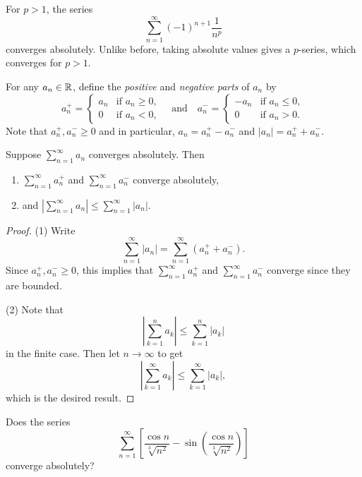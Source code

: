 \begin{example}
  For $p > 1$, the series
  \[
    \sum_{n = 1}^\infty (-1)^{n + 1} \frac{1}{n^p}
  \]
  converges absolutely. Unlike before, taking absolute
  values gives a $p$-series, which converges for $p > 1$.
\end{example}

\begin{definition}
  For any $a_n \in \mathbb{R}$, define the \emph{positive} and
  \emph{negative parts} of $a_n$ by
  \[
    a_n^+ =
    \begin{cases}
      a_n & \text{if } a_n \ge 0, \\
      0 & \text{if } a_n < 0,
    \end{cases}
    \quad \text{and} \quad
    a_n^- =
    \begin{cases}
      -a_n & \text{if } a_n \le 0, \\
      0 & \text{if } a_n > 0.
    \end{cases}
  \]
  Note that $a_n^+, a_n^- \ge 0$ and
  in particular, $a_n = a_n^+ - a_n^-$ and
  $|a_n| = a_n^+ + a_n^-$.
\end{definition}

\begin{theorem}
  Suppose $\sum_{n = 1}^\infty a_n$ converges absolutely.
  Then
  \begin{enumerate}
    \item $\sum_{n = 1}^\infty a_n^+$ and
    $\sum_{n = 1}^\infty a_n^-$ converge absolutely,
  \item and $\left|\sum_{n = 1}^\infty a_n\right| \le \sum_{n = 1}^\infty |a_n|$.
  \end{enumerate}
\end{theorem}

\begin{proof}
  (1) Write
  \[
    \sum_{n = 1}^\infty |a_n|
    = \sum_{n = 1}^\infty (a_n^+ + a_n^-).
  \]
  Since $a_n^+, a_n^- \ge 0$, this implies that
  $\sum_{n = 1}^\infty a_n^+$ and
  $\sum_{n = 1}^\infty a_n^-$ converge since they
  are bounded.

  (2) Note that
  \[
    \left|\sum_{k = 1}^n a_k\right|
    \le \sum_{k = 1}^n |a_k|
  \]
  in the finite case. Then let $n \to \infty$
  to get
  \[
    \left|\sum_{k = 1}^\infty a_k\right|
    \le \sum_{k = 1}^\infty |a_k|,
  \]
  which is the desired result.
\end{proof}

\begin{example}
  Does the series
  \[
    \sum_{n = 1}^\infty
    \left[\frac{\cos n}{\sqrt[3]{n^2}} - \sin\left(\frac{\cos n}{\sqrt[3]{n^2}}\right)\right]
  \]
  converge absolutely?
\end{example}

